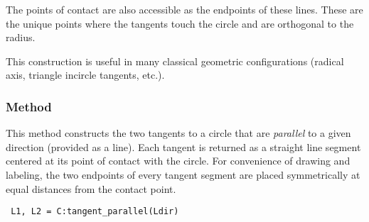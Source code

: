 \medskip
\noindent
The points of contact are also accessible as the endpoints of these lines. These are the unique points where the tangents touch the circle and are orthogonal to the radius.

\medskip
\noindent
This construction is useful in many classical geometric configurations (radical axis, triangle incircle tangents, etc.).

\vspace{1em}


\begin{minipage}{.5\textwidth}
\begin{center}
\end{center}

\end{minipage}
\begin{minipage}{.5\textwidth}
\begin{tkzexample}
\end{tkzexample}
\end{minipage}

\subsubsection{Method }
\label{ssub:method_circle_tangent_parallel}
This method constructs the two tangents to a circle that are \emph{parallel} to a given direction (provided as a line).
\medskip
\noindent
Each tangent is returned as a straight line segment centered at its point of contact with the circle. For convenience of drawing and labeling, the two endpoints of every tangent segment are placed symmetrically at equal distances from the contact point.
\medskip
\noindent

\begin{verbatim}
 L1, L2 = C:tangent_parallel(Ldir)
\end{verbatim}


